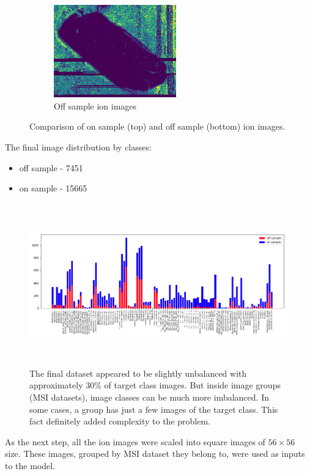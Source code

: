 \documentclass[a4paper]{article}
\begin{document}
\begin{figure}[H]
\begin{subfigure}[b]{\textwidth}
        \includegraphics[width=\textwidth,height=4cm,keepaspectratio]{off_sample_3.png}
        \caption{Off sample ion images}
    \end{subfigure}
    \caption{Comparison of on sample (top) and off sample (bottom) ion images.}
\end{figure}

The final image distribution by classes:

\begin{itemize}
    \item off sample - 7451
    \item on sample - 15665
\end{itemize}

\begin{figure}[H]
    \centering
        \includegraphics[width=\textwidth,height=7cm]{class_distribution.png}
    \caption{The final dataset appeared to be slightly unbalanced with approximately 30\%
    of target class images. But inside image groups (MSI datasets),
    image classes can be much more imbalanced.
    In some cases, a group has just a few images of the target class.
    This fact definitely added complexity to the problem.}
\end{figure}

As the next step, all the ion images were scaled into square images of $56 \times 56$ size.
These images, grouped by MSI dataset they belong to, were used as inputs to the model.
\end{document}
